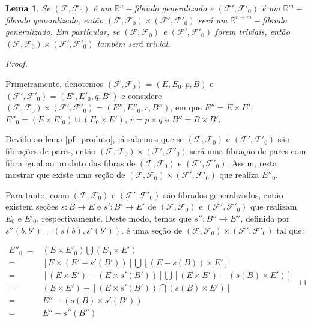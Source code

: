 \documentclass[12pt,oneside]{book} %
\newtheorem{lem}    {\hspace{0.5cm}Lema}[chapter]
\newcommand{\R}{\mathbb{R}}
\begin{document}
\begin{lem}\label{fht_produto}
	Se $(\mathcal{F},\mathcal{F}_{0})$ é um $\R^{n}-$fibrado generalizado e $(\mathcal{F'},\mathcal{F'}_{0})$ é um $\R^{m}-$fibrado generalizado, então $(\mathcal{F},\mathcal{F}_{0})\times(\mathcal{F'},\mathcal{F'}_{0})$ será um $\R^{n+m}-$fibrado generalizado. Em particular, se $(\mathcal{F},\mathcal{F}_{0})$ e $(\mathcal{F'},\mathcal{F'}_{0})$ forem triviais, então $(\mathcal{F},\mathcal{F}_{0})\times (\mathcal{F'},\mathcal{F'}_{0})$ também será trivial.
\end{lem}
\begin{proof}
	
	\
	
	\par Primeiramente, denotemos $(\mathcal{F},\mathcal{F}_{0})=(E,E_{0},p,B)$ e $(\mathcal{F'},\mathcal{F'}_{0})=(E',E'_{0},q,B')$ e considere $(\mathcal{F},\mathcal{F}_{0})\times(\mathcal{F'},\mathcal{F'}_{0})=(E'',E''_{0},r,B'')$, em que $E''=E\times E'$, $E''_{0}=(E\times E'_{0})\cup (E_{0}\times E')$, $r=p\times q$ e $B''=B\times B'$.
	
	\par Devido ao lema \ref{pf_produto}, já sabemos que se $(\mathcal{F},\mathcal{F}_{0})$ e $(\mathcal{F'},\mathcal{F'}_{0})$ são fibrações de pares, então $(\mathcal{F},\mathcal{F}_{0})\times(\mathcal{F'},\mathcal{F'}_{0})$  será uma fibração de pares com fibra igual ao produto das fibras de $(\mathcal{F},\mathcal{F}_{0})$ e $(\mathcal{F'},\mathcal{F'}_{0})$. Assim, resta mostrar que existe uma seção de $(\mathcal{F},\mathcal{F}_{0})\times(\mathcal{F'},\mathcal{F'}_{0})$ que realiza $E''_{0}$.
	
	\par Para tanto, como $(\mathcal{F},\mathcal{F}_{0})$ e $(\mathcal{F'},\mathcal{F'}_{0})$ são fibrados generalizados, então existem seções $s:B\to E$ e $s':B'\to E'$ de $(\mathcal{F},\mathcal{F}_{0})$ e $(\mathcal{F'},\mathcal{F'}_{0})$ que realizam $E_{0}$ e $E'_{0}$, respectivamente. Deste modo, temos que $s'':B''\to E''$, definida por $s''(b,b')=(s(b),s'(b'))$, é uma seção de $(\mathcal{F},\mathcal{F}_{0})\times(\mathcal{F'},\mathcal{F'}_{0})$ tal que: \newline
	
	$\begin{array}{rl}
		E''_{0} \ = & (E\times E'_{0})\bigcup (E_{0}\times E') \\
		= & [E\times (E'-s'(B'))]\bigcup [(E-s(B))\times E'] \\
		= & [(E\times E')-(E\times s'(B'))] \bigcup [(E\times E')-(s(B)\times E')] \\
		= & (E\times E')-[(E\times s'(B'))\bigcap (s(B)\times E')] \\
		= & E''-(s(B)\times s'(B')) \\
		= & E''-s''(B'')
	\end{array}$ \newline
	

\end{proof}
\end{document}

